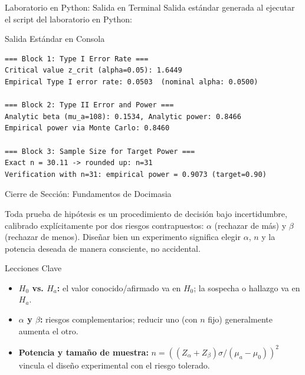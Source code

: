 \documentclass[10pt, aspectratio=169]{beamer}
\begin{document}
\begin{frame}[fragile]{Laboratorio en Python: Salida en Terminal}
  \scriptsize
  Salida estándar generada al ejecutar el script del laboratorio en Python:
  \vspace{0.02cm}
  \begin{block}{Salida Estándar en Consola}
    \fontsize{4pt}{5pt}\selectfont
    \begin{verbatim}
=== Block 1: Type I Error Rate ===
Critical value z_crit (alpha=0.05): 1.6449
Empirical Type I error rate: 0.0503  (nominal alpha: 0.0500)

=== Block 2: Type II Error and Power ===
Analytic beta (mu_a=108): 0.1534, Analytic power: 0.8466
Empirical power via Monte Carlo: 0.8460

=== Block 3: Sample Size for Target Power ===
Exact n = 30.11 -> rounded up: n=31
Verification with n=31: empirical power = 0.9073 (target=0.90)
    \end{verbatim}
  \end{block}
\end{frame}

\begin{frame}{Cierre de Sección: Fundamentos de Docimasia}
  \begin{reflexion}
    Toda prueba de hipótesis es un procedimiento de decisión bajo incertidumbre, calibrado explícitamente por dos riesgos contrapuestos: $\alpha$ (rechazar de más) y $\beta$ (rechazar de menos). Diseñar bien un experimento significa elegir $\alpha$, $n$ y la potencia deseada de manera consciente, no accidental.
  \end{reflexion}

  \vspace{0.2cm}
  \pause
  \begin{block}{Lecciones Clave}
    \begin{itemize}\itemsep=0.08cm
      \item \textbf{$H_0$ vs. $H_a$:} el valor conocido/afirmado va en $H_0$; la sospecha o hallazgo va en $H_a$.
      \item \textbf{$\alpha$ y $\beta$:} riesgos complementarios; reducir uno (con $n$ fijo) generalmente aumenta el otro.
      \item \textbf{Potencia y tamaño de muestra:} $n=((Z_\alpha+Z_\beta)\sigma/(\mu_a-\mu_0))^2$ vincula el diseño experimental con el riesgo tolerado.
    \end{itemize}
  \end{block}
\end{frame}
\end{document}
